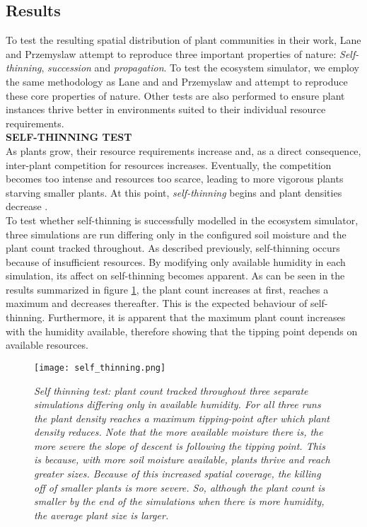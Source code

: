 \subsection{Results} \label{subsec:ecosystem_simulator_results}

To test the resulting spatial distribution of plant communities in their work, Lane and Przemyslaw \cite{Lane2002} attempt to reproduce three important properties of nature: \textit{Self-thinning}, \textit{succession} and \textit{propagation}. To test the ecosystem simulator, we employ the same methodology as Lane and and Przemyslaw \cite{Lane2002} and attempt to reproduce these core properties of nature. Other tests are also performed to ensure plant instances thrive better in environments suited to their individual resource requirements.\\

\textbf{SELF-THINNING TEST}\\

As plants grow, their resource requirements increase and, as a direct consequence, inter-plant competition for resources increases. Eventually, the competition becomes too intense and resources too scarce, leading to more vigorous plants starving smaller plants. At this point, \textit{self-thinning} begins and plant densities decrease \cite{Lane2002}.\\
To test whether self-thinning is successfully modelled in the ecosystem simulator, three simulations are run differing only in the configured soil moisture and the plant count tracked throughout. As described previously, self-thinning occurs because of insufficient resources. By modifying only available humidity in each simulation, its affect on self-thinning becomes apparent. As can be seen in the results summarized in figure \ref{fig:self_thinning_test_results}, the plant count increases at first, reaches a maximum and decreases thereafter. This is the expected behaviour of self-thinning. Furthermore, it is apparent that the maximum plant count increases with the humidity available, therefore showing that the tipping point depends on available resources.\\

\begin{figure}
\center
	\texttt{[image: self\_thinning.png]}
	\caption{ \textit{Self thinning test: plant count tracked throughout three separate simulations differing only in available humidity. For all three runs the plant density reaches a maximum tipping-point after which plant density reduces. Note that the more available moisture there is, the more severe the slope of descent is following the tipping point. This is because, with more soil moisture available, plants thrive and reach greater sizes. Because of this increased spatial coverage, the killing off of smaller plants is more severe. So, although the plant count is smaller by the end of the simulations when there is more humidity, the average plant size is larger.}}
	\label{fig:self_thinning_test_results}
\end{figure}

